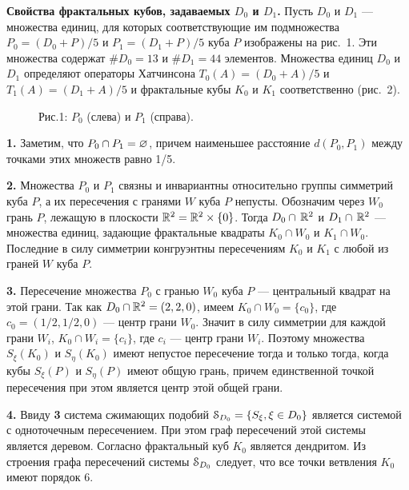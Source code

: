 {\bf Свойства фрактальных кубов, задаваемых $ D_0$ и  $ D_1$.}
Пусть $ D_0$ и $ D_1$ --- множества единиц, для которых соответствующие им подмножества $P_0=( D_0+P)/5$  и $P_1=( D_1+P)/5$ куба $P$ изображены на рис.~1. Эти множества содержат $\# D_0=13$ и $\# D_1= 44$ элементов.
 Множества единиц $ D_0$ и $ D_1$ определяют операторы Хатчинсона $ T_0(A)=( D_0+A)/{5}$   и $T_1(A)=( D_1+A)/{5}$   и фрактальные кубы $K_0$ и $K_1$ соответственно (рис.~2).\smallskip

\begin{figure}[b!]\begin{center}
{\footnotesize Рис.1: $P_0$ (слева)  и $P_1$ (справа).}
\end{center}\end{figure}


{\bf 1.} Заметим, что $P_0\cap P_1=\varnothing$, причем наименьшее расстояние $d(P_0,P_1)$ между точками этих множеств  равно 1/5.\smallskip

{\bf 2.} Множества $P_0$ и $P_1$ связны  и  инвариантны относительно группы симметрий куба $P$,  а их пересечения с гранями $W$ куба $P$ непусты. Обозначим через $W_0$   грань  $P$, лежащую в плоскости $\mathbb{R}^2=\mathbb{R}^2\times\{0\}$. Тогда $ D_0\cap\, \mathbb{R}^2$ и $ D_1\cap\, \mathbb{R}^2$ --- множества единиц, задающие фрактальные квадраты $K_0\cap W_0$ и $K_1\cap W_0$. Последние в силу симметрии конгруэнтны пересечениям $K_0$ и $K_1$ с любой из граней $W$ куба $P$.\smallskip

{\bf 3.} Пересечение множества $P_0$  с гранью $W_0$ куба $P$ --- центральный квадрат  на этой грани. Так как $ D_0\cap \mathbb{R}^2=(2,2,0)$,  имеем $K_0\cap W_0=\{c_0\} $, где $c_0=(1/2,1/2,0)$ --- центр грани $W_0$. Значит в силу симметрии для каждой грани $W_i$,  $K_0\cap W_i=\{c_i\} $, где $c_i$ --- центр грани $W_i$. Поэтому множества $S_\xi(K_0)$ и $S_\eta(K_0)$ имеют непустое пересечение тогда и только тогда, когда кубы  $S_\xi(P)$ и $S_\eta(P)$ имеют общую грань, причем   единственной точкой пересечения при этом является центр этой общей грани.\smallskip

{\bf 4.} Ввиду {\bf 3} система сжимающих подобий ${\EuScript S}_{ D_0}=\{S_\xi,\xi\in  D_0\}$ является системой с одноточечным пересечением. При этом  граф пересечений этой системы является деревом. Согласно \cite[Theorem 1.7]{finprop} фрактальный куб $K_0$ является дендритом. Из строения графа пересечений системы ${\EuScript S}_{ D_0}$ следует, что  все точки ветвления $K_0$ имеют порядок 6.\smallskip

